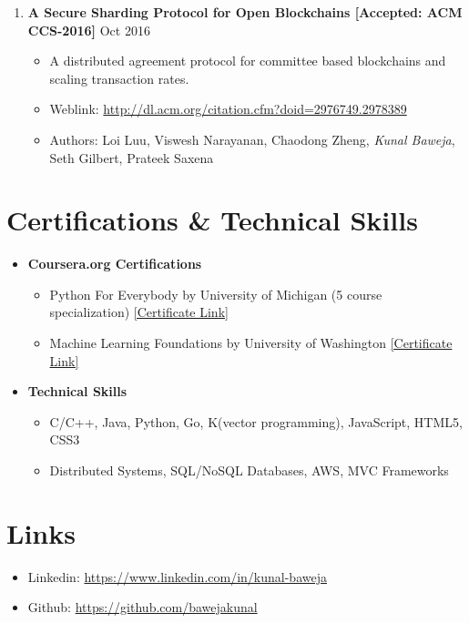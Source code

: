 \documentclass{article}
\newcommand{\bi}{\vspace{-1mm}\begin{itemize}[align=left,leftmargin=*, rightmargin=80pt, labelindent=0pt,labelsep=2pt, label={-}, nosep]}
\newcommand{\ei}{\end{itemize}}
\begin{document}
\begin{enumerate}

    \item \textbf{A Secure Sharding Protocol for Open Blockchains [Accepted: ACM CCS-2016]} {\hfill Oct 2016}
    \bi

        \item A distributed agreement protocol for committee based blockchains and scaling transaction rates.

        \item Weblink: \href{http://dl.acm.org/citation.cfm?doid=2976749.2978389}{http://dl.acm.org/citation.cfm?doid=2976749.2978389}
        
        \item Authors: Loi Luu, Viswesh Narayanan, Chaodong Zheng, \textit{Kunal Baweja}, Seth Gilbert, Prateek Saxena
    \ei

\end{enumerate}

\vspace{-2mm}
\section*{Certifications \& Technical Skills}
\begin{itemize}
    \item \textbf{Coursera.org Certifications}
    \bi
        \item Python For Everybody by University of Michigan (5 course specialization) \href{https://www.coursera.org/account/accomplishments/specialization/2B5PCJGZ9WEE}{[Certificate Link]}

        \item Machine Learning Foundations by University of Washington \href{https://www.coursera.org/account/accomplishments/certificate/NDVXWMCYKX9N}{[Certificate Link]}
    \ei

    \item \textbf{Technical Skills}
    \bi
        \item C/C++, Java, Python, Go, K(vector programming), JavaScript, HTML5, CSS3
        \item Distributed Systems, SQL/NoSQL Databases, AWS, MVC Frameworks
    \ei
\end{itemize}

\vspace{-2mm}
\section*{Links}
\begin{itemize}[nosep]
    \item Linkedin: \href{https://www.linkedin.com/in/kunal-baweja}{https://www.linkedin.com/in/kunal-baweja}
    \item Github: \href{https://github.com/bawejakunal}{https://github.com/bawejakunal}
\end{itemize}
\end{document}
